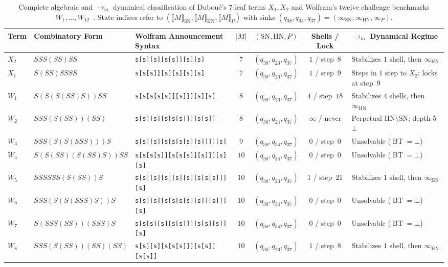 \documentclass[11pt,reqno]{amsart}
\numberwithin{equation}{section}
\theoremstyle{plain}
\theoremstyle{definition}
\theoremstyle{remark}
\DeclareMathOperator{\BT}{BT}
\newcommand{\SN}{\mathrm{SN}}
\newcommand{\HN}{\mathrm{HN}}
\newcommand{\sem}[1]{\llbracket #1 \rrbracket}
\begin{document}
\begin{table}[htbp]
\centering
\caption{Complete algebraic and $\to_{\mathrm{lo}}$ dynamical classification of Dubou\'e's $7$-leaf terms $X_1, X_2$ and Wolfram's twelve challenge benchmarks $W_1, \dots, W_{12}$~\cite{Wolfram2021Challenge}. State indices refer to $(\sem{M}_{\SN}, \sem{M}_{\HN}, \sem{M}_P)$ with sinks $(q_{38}, q_{34}, q_{37}) = (\infty_{\SN}, \infty_{\HN}, \infty_P)$.}
\label{tab:wolfram-benchmarks}
\footnotesize
\setlength{\tabcolsep}{4.2pt}
\begin{tabular}{@{}lllcccl@{}}
\toprule
Term & Combinatory Form & Wolfram Announcement Syntax & $|M|$ & $(\SN, \HN, P)$ & Shells / Lock & $\to_{\mathrm{lo}}$ Dynamical Regime \\
\midrule
$X_2$ & $S S S (S S) S S$ & \texttt{s[s][s][s[s]][s][s]} & $7$ & $(q_{38}, q_{23}, q_{37})$ & $1$ / step~$8$ & Stabilizes $1$ shell, then $\infty_{\HN}$ \\
$X_1$ & $S(S S)S S S S$ & \texttt{s[s[s]][s][s][s][s]} & $7$ & $(q_{38}, q_{23}, q_{37})$ & $1$ / step~$9$ & Steps in $1$ step to $X_2$; locks at step~$9$ \\
$W_1$ & $S(S(S(S S)S))S S$ & \texttt{s[s[s[s[s]][s]]][s][s]} & $8$ & $(q_{38}, q_{23}, q_{37})$ & $4$ / step~$18$ & Stabilizes $4$ shells, then $\infty_{\HN}$ \\
$W_2$ & $S S S (S(S S))(S S)$ & \texttt{s[s][s][s[s[s]]][s[s]]} & $8$ & $(q_{38}, q_{24}, q_{37})$ & $\infty$ / never & Perpetual $\HN\setminus\SN$; depth-$5$ $\bot$ \\
$W_3$ & $S S S (S(S(S S S)))S$ & \texttt{s[s][s][s[s[s[s][s]]]][s]} & $9$ & $(q_{38}, q_{34}, q_{37})$ & $0$ / step~$0$ & Unsolvable ($\BT = \bot$) \\
$W_4$ & $S(S(S S)(S(S S)S))S S$ & \texttt{s[s[s[s]][s[s[s]][s]]][s][s]} & $10$ & $(q_{38}, q_{34}, q_{37})$ & $0$ / step~$0$ & Unsolvable ($\BT = \bot$) \\
$W_5$ & $S S S S S S (S(S S))S$ & \texttt{s[s][s][s][s][s][s[s[s]]][s]} & $10$ & $(q_{38}, q_{23}, q_{37})$ & $1$ / step~$21$ & Stabilizes $1$ shell, then $\infty_{\HN}$ \\
$W_6$ & $S S S (S(S(S S S)S))S$ & \texttt{s[s][s][s[s[s[s][s]][s]]][s]} & $10$ & $(q_{38}, q_{34}, q_{37})$ & $0$ / step~$0$ & Unsolvable ($\BT = \bot$) \\
$W_7$ & $S(S S S (S S))(S S S)S$ & \texttt{s[s[s][s][s[s]]][s[s][s]][s]} & $10$ & $(q_{38}, q_{34}, q_{37})$ & $0$ / step~$0$ & Unsolvable ($\BT = \bot$) \\
$W_8$ & $S S S (S(S S))(S S)(S S)$ & \texttt{s[s][s][s[s[s]]][s[s]][s[s]]} & $10$ & $(q_{38}, q_{23}, q_{37})$ & $1$ / step~$8$ & Stabilizes $1$ shell, then $\infty_{\HN}$ \\

\end{tabular}
\end{table}
\end{document}
